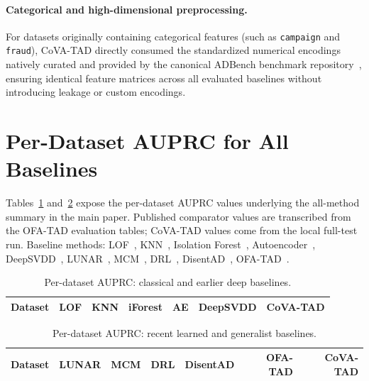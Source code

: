 \documentclass{article}
\begin{document}
\paragraph{Categorical and high-dimensional preprocessing.}
For datasets originally containing categorical features (such as \texttt{campaign} and \texttt{fraud}), CoVA-TAD directly consumed the standardized numerical encodings natively curated and provided by the canonical ADBench benchmark repository~\citep{han2022adbench}, ensuring identical feature matrices across all evaluated baselines without introducing leakage or custom encodings.

\section{Per-Dataset AUPRC for All Baselines}
\label{app:all-pr}

Tables~\ref{tab:all-pr-1} and~\ref{tab:all-pr-2} expose the per-dataset AUPRC values underlying the all-method summary in the main paper. Published comparator values are transcribed from the OFA-TAD evaluation tables; CoVA-TAD values come from the local full-test run. Baseline methods: LOF~\citep{breunig2000lof}, KNN~\citep{ramaswamy2000knn}, Isolation Forest~\citep{liu2008isolation}, Autoencoder~\citep{sakurada2014autoencoder}, DeepSVDD~\citep{ruff2018deep}, LUNAR~\citep{goodge2022lunar}, MCM~\citep{yin2024mcm}, DRL~\citep{ye2025drl}, DisentAD~\citep{ye2025disentad}, OFA-TAD~\citep{li2026towards}.

\begin{table}[h]
\centering
\caption{Per-dataset AUPRC: classical and earlier deep baselines.}
\label{tab:all-pr-1}
\small
\setlength{\tabcolsep}{4.5pt}
\begin{tabular}{lrrrrrr}
\toprule
Dataset & LOF & KNN & iForest & AE & DeepSVDD & CoVA-TAD\\
\midrule
%
\end{tabular}
\end{table}

\begin{table}[h]
\centering
\caption{Per-dataset AUPRC: recent learned and generalist baselines.}
\label{tab:all-pr-2}
\small
\setlength{\tabcolsep}{4.5pt}
\begin{tabular}{lrrrrrr}
\toprule
Dataset & LUNAR & MCM & DRL & DisentAD & OFA-TAD & CoVA-TAD\\
\midrule
%
\end{tabular}
\end{table}
\end{document}
